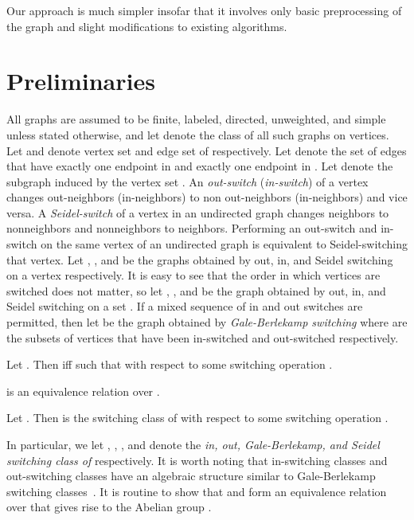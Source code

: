 \documentclass{llncs}
\begin{document}
Our approach is much simpler insofar that it involves only basic preprocessing of the graph and slight modifications to existing algorithms.

\section{Preliminaries}
All graphs are assumed to be finite, labeled, directed, unweighted, and simple unless stated otherwise, and let  denote the class of all such graphs on  vertices. Let  and  denote vertex set and edge set of  respectively.  Let  denote the set of edges that have exactly one endpoint in  and exactly one endpoint in .  Let  denote the subgraph induced by the vertex set .  An \emph{out-switch} (\emph{in-switch}) of a vertex changes out-neighbors (in-neighbors) to non out-neighbors (in-neighbors) and vice versa. A \emph{Seidel-switch} of a vertex in an undirected graph changes neighbors to nonneighbors and nonneighbors to neighbors.  Performing an out-switch and in-switch on the same vertex of an undirected graph is equivalent to Seidel-switching that vertex.  Let , , and  be the graphs obtained by out, in, and Seidel switching on a vertex  respectively.  It is easy to see that the order in which vertices are switched does not matter, so let , , and  be the graph obtained by out, in, and Seidel switching on a set .  If a mixed sequence of in and out switches are permitted, then let  be the graph obtained by \emph{Gale-Berlekamp switching} where  are the subsets of vertices that have been in-switched and out-switched respectively.

\begin{definition}
Let .  Then  iff  such that  with respect to some switching operation .
\end{definition}

\begin{proposition}
 is an equivalence relation over .
\end{proposition}

\begin{definition}
Let .  Then  is the switching class of  with respect to some switching operation .
\end{definition}

\noindent 
In particular, we let , , , and  denote the \emph{in, out, Gale-Berlekamp, and Seidel switching class of}  respectively.  It is worth noting that in-switching classes and out-switching classes have an algebraic structure similar to Gale-Berlekamp switching classes~\cite{RothV08}. It is routine to show that   and  form an equivalence relation over  that gives rise to the Abelian group .
\end{document}
